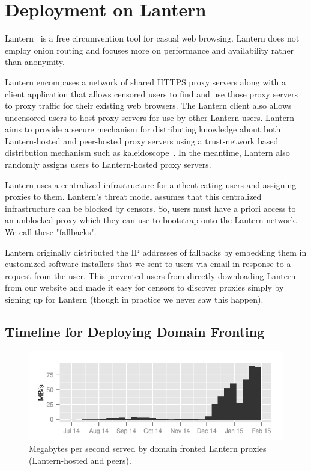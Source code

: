 \documentclass{sig-alternate}
\begin{document}
\section{Deployment on Lantern}
\label{sec:deploy-lantern}

Lantern~\cite{lantern} is a free circumvention tool for casual web browsing.
Lantern does not employ onion routing and focuses more on performance and
availability rather than anonymity.

Lantern encompases a network of shared HTTPS proxy servers along with a client
application that allows censored users to find and use those proxy servers to
proxy traffic for their existing web browsers. The Lantern client also allows
uncensored users to host proxy servers for use by other Lantern users. Lantern 
aims to provide a secure mechanism for distributing knowledge about both
Lantern-hosted and peer-hosted proxy servers using a trust-network based
distribution mechanism such as kaleidoscope~\cite{kaleidoscope}. In the
meantime, Lantern also randomly assigns users to Lantern-hosted proxy servers.

Lantern uses a centralized infrastructure for authenticating users and
assigning proxies to them. Lantern's threat model assumes that this
centralized infrastructure can be blocked by censors. So, users must have a
priori access to an unblocked proxy which they can use to bootstrap onto the
Lantern network. We call these "fallbacks".

Lantern originally distributed the IP addresses of fallbacks by embedding them
in customized software installers that we sent to users via email in response to
a request from the user. This prevented users from directly downloading Lantern
from our website and made it easy for censors to discover proxies simply by
signing up for Lantern (though in practice we never saw this happen).

\subsection{Timeline for Deploying Domain Fronting}

\begin{figure}
\centering
\includegraphics[width=\linewidth]{bandwidth-lantern}
\caption{
Megabytes per second served by domain fronted Lantern proxies
(Lantern-hosted and peers).
}
\label{fig:lantern-bandwidth}
\end{figure}
\end{document}
